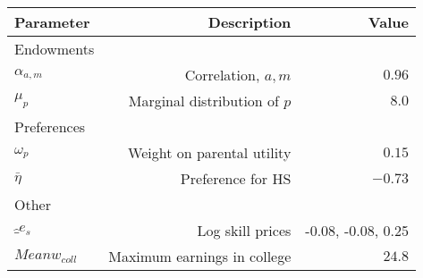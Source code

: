 \begin{tabular}{lrr}
\hline
Parameter & Description  & Value  \\
\hline
Endowments &   &   \\
$\alpha_{a,m}$ & Correlation, $a,m$  & $0.96$  \\
$\mu_{p}$ & Marginal distribution of $p$  & $8.0$  \\
Preferences &   &   \\
$\omega_{p}$ & Weight on parental utility  & $0.15$  \\
$\bar{\eta}$ & Preference for HS  & $-0.73$  \\
Other &   &   \\
$\hat_{e}_{s}$ & Log skill prices  & -0.08, -0.08, 0.25  \\
$Mean w_{coll}$ & Maximum earnings in college  & $24.8$  \\
\hline
\end{tabular}%
